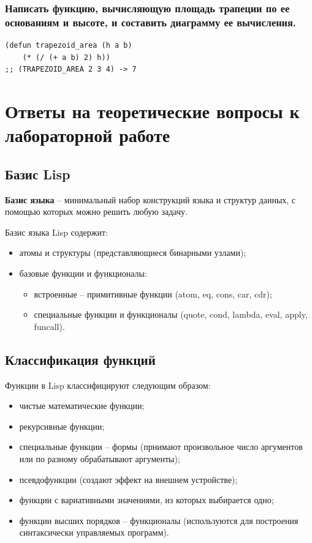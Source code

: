 \documentclass[a4paper,14pt, unknownkeysallowed]{extreport}
\begin{document}
\subsection{Написать функцию, вычисляющую площадь трапеции по ее основаниям и высоте, и составить диаграмму ее вычисления.}

\begin{center}
\captionsetup{justification=raggedright,singlelinecheck=off}
\begin{lstlisting}[label=lst:parallel_processing,caption=Решение дополнительного задания 2]
(defun trapezoid_area (h a b) 
	(* (/ (+ a b) 2) h))
;; (TRAPEZOID_AREA 2 3 4) -> 7
\end{lstlisting}
\end{center}


\chapter{Ответы на теоретические вопросы к лабораторной работе}

\section{Базис Lisp}

\textbf{Базис языка} -- минимальный набор конструкций языка и структур данных, с помощью которых можно решить любую задачу.

Базис языка Lisp содержит:

\begin{itemize}
	\item атомы и структуры (представляющиеся бинарными узлами);
	\item базовые функции и функционалы:
	\begin{itemize}
		\item встроенные -- примитивные функции (atom, eq, cons, car, cdr);
		\item специальные функции и функционалы (quote, cond, lambda, eval, apply, funcall).
	\end{itemize}
\end{itemize}

\section{Классификация функций}

Функции в Lisp классифицируют следующим образом:

\begin{itemize}
	\item чистые математические функции;
	\item рекурсивные функции;
	\item специальные функции -- формы (прнимают произвольное число аргументов или по разному обрабатывают аргументы);
	\item псевдофункции (создают эффект на внешнем устройстве);
	\item функции с вариативными значениями, из которых выбирается одно;
	\item функции высших порядков -- функционалы (используются для построения синтаксически управляемых программ).
\end{itemize}
\end{document}
